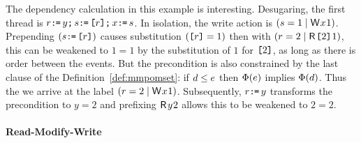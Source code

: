 The dependency calculation in this example is interesting.  Desugaring, the
first thread is $r\texttt{:}\mkern-1mu\texttt{=}\, y\texttt{;}\,\allowbreak s\texttt{:}\mkern-1mu\texttt{=}\, \texttt{[}r\texttt{]}\texttt{;}\,\allowbreak x\texttt{:}\mkern-1mu\texttt{=}\, s$.
In isolation, the write action is $(\bReg=1\mid\DW{x}{1})$.  Prepending
$(s\texttt{:}\mkern-1mu\texttt{=}\, \texttt{[}r\texttt{]})$ causes substitution $(\texttt{[}r\texttt{]}=1)$ then with
$(\aReg=2\mid\DR{\REF{2}}{1})$, this can be weakened to $1=1$ by the
substitution of $1$ for $\texttt{[}2\texttt{]}$, as long as there is order between the
events.  But the precondition is also constrained by the last clause of the
Definition~\ref{def:mmpomset}: if $d\le e$ then $\Phi(e)$
implies $\Phi(d)$.
%
Thus the we arrive at the label $(\aReg=2\mid\DW{x}{1})$.  Subsequently,
$r\texttt{:}\mkern-1mu\texttt{=}\, y$ transforms the precondition to $y=2$ and prefixing $\DR{y}{2}$
allows this to be weakened to $2=2$.


\paragraph{Read-Modify-Write}


